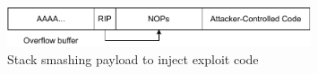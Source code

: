 \begin{figure}[htp!]
    \centering
    \includegraphics[width=0.8\textwidth]{assets/figures/chapter2/stack-smashing-payload.pdf}
    \caption{Stack smashing payload to inject exploit code}
    \label{fig:stack-smashing-payload}
\end{figure}
